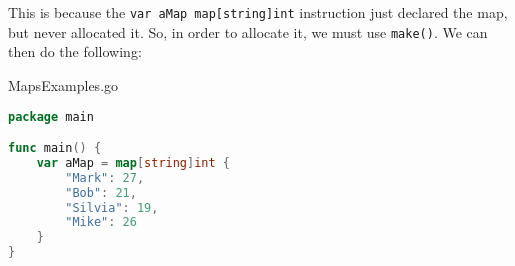 This is because the \verb|var aMap map[string]int| instruction just declared the map, but never allocated it. So, in order to allocate it, we must use \verb|make()|. We can then do the following:

\begin{codeblock}{MapsExamples.go}
    \begin{lstlisting}[language = go]
package main

func main() {
    var aMap = map[string]int {
        "Mark": 27,
        "Bob": 21,
        "Silvia": 19,
        "Mike": 26
    }
}\end{lstlisting}
\end{codeblock}